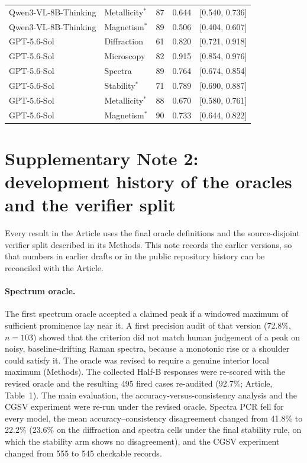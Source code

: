 \documentclass[11pt,a4paper]{article}
\begin{document}
\begin{table}[htbp]
{\begin{tabular}{l l S[table-format=3.0] S[table-format=1.3] c}
Qwen3-VL-8B-Thinking & Metallicity$^{*}$ & 87 & 0.644 & [0.540, 0.736] \\
Qwen3-VL-8B-Thinking & Magnetism$^{*}$ & 89 & 0.506 & [0.404, 0.607] \\
\addlinespace
GPT-5.6-Sol & Diffraction & 61 & 0.820 & [0.721, 0.918] \\
GPT-5.6-Sol & Microscopy & 82 & 0.915 & [0.854, 0.976] \\
GPT-5.6-Sol & Spectra & 89 & 0.764 & [0.674, 0.854] \\
GPT-5.6-Sol & Stability$^{*}$ & 71 & 0.789 & [0.690, 0.887] \\
GPT-5.6-Sol & Metallicity$^{*}$ & 88 & 0.670 & [0.580, 0.761] \\
GPT-5.6-Sol & Magnetism$^{*}$ & 90 & 0.733 & [0.644, 0.822] \\
\bottomrule
\end{tabular}}
\end{table}

\clearpage
\section*{Supplementary Note 2: development history of the oracles and the verifier split}
Every result in the Article uses the final oracle definitions and the source-disjoint verifier
split described in its Methods. This note records the earlier versions, so that numbers in
earlier drafts or in the public repository history can be reconciled with the Article.

\paragraph{Spectrum oracle.} The first spectrum oracle accepted a claimed peak if a windowed maximum
of sufficient prominence lay near it. A first precision audit of that version (72.8\%, $n=103$)
showed that the criterion did not match human judgement of a peak on noisy, baseline-drifting
Raman spectra, because a monotonic rise or a shoulder could satisfy it. The oracle was revised to
require a genuine interior local maximum (Methods). The collected Half-B responses were re-scored
with the revised oracle and the resulting 495 fired cases re-audited (92.7\%; Article, Table~1).
The main evaluation, the accuracy-versus-consistency analysis and the CGSV experiment were re-run
under the revised oracle. Spectra PCR fell for every model, the mean accuracy--consistency
disagreement changed from 41.8\% to 22.2\% (23.6\% on the diffraction and spectra cells under the final
stability rule, on which the stability arm shows no disagreement), and the CGSV experiment changed from 555 to 545
checkable records.
\end{document}
